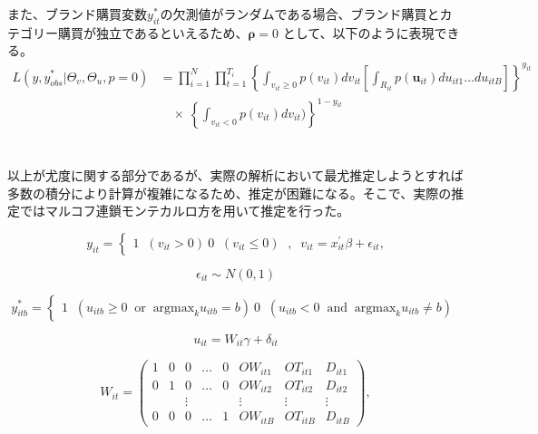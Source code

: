 \documentclass[11pt]{jsarticle}
\begin{document}
また、ブランド購買変数$y_{it}^{*}$の欠測値がランダムである場合、ブランド購買とカテゴリー購買が独立であるといえるため、${\boldsymbol \rho} = 0$ として、以下のように表現できる。\\
\begin{equation} \label{formulad2_2}
\begin{split}
L(y, y^\ast_{obs} | \Theta_{v}, \Theta_{u}, p = 0) &= \prod_{i=1}^{N} \prod_{t=1}^{T_{i}}
\left\{
\int_{v_{it} \geq 0} p(v_{it}) dv_{it}
\left[
\int_{R_{it}} p(\textbf{u}_{it} ) du_{it1} \ldots du_{itB}
\right]
\right\}^{y_{it}} \\
& \quad \times \
\left\{
\int_{v_{it} < 0} p(v_{it})dv_{it})
\right\}^{1 - y_{it}}
\end{split}
\end{equation}\\
\\
以上が尤度に関する部分であるが、実際の解析において最尤推定しようとすれば多数の積分により計算が複雑になるため、推定が困難になる。そこで、実際の推定ではマルコフ連鎖モンテカルロ方を用いて推定を行った。

\begin{equation} \label{formulad2_3}
y_{it} = \begin{cases}
             1 \;\; ( v_{it} > 0 )\
             0 \;\; ( v_{it} \leq 0 )\
             \end{cases}
             , \;\; v_{it} = x^{\prime}_{it} \beta + \epsilon_{it},
\end{equation}


\begin{equation} \label{formulad2_4}
\epsilon_{it} \sim N(0, 1)
\end{equation}


\begin{equation} \label{formulad2_5}
y^\ast_{itb} = \begin{cases}
             1 \;\; ( u_{itb} \geq 0 \;\; \mbox{or} \;\; \mbox{argmax}_{k}u_{itb} = b)\
             0 \;\; ( u_{itb} < 0 \;\; \mbox{and} \;\; \mbox{argmax}_{k}u_{itb} \neq b)\
             \end{cases}
\end{equation}

\begin{equation} \label{formulad2_6}
u_{it} = W_{it}\gamma + \delta_{it}
\end{equation}

\begin{equation} \label{formulad2_7}
  W_{it} =
  \begin{pmatrix}
      1 & 0 & 0 & \ldots & 0 & OW_{it1} & OT_{it1} & D_{it1} \\
      0 & 1 & 0 & \ldots & 0 & OW_{it2} & OT_{it2} & D_{it2} \\
       &  & \vdots &  &  & \vdots & \vdots & \vdots \\
      0 & 0 & 0 & \ldots & 1 & OW_{itB} & OT_{itB} & D_{itB}
    \end{pmatrix}
    ,
\end{equation}
\end{document}
